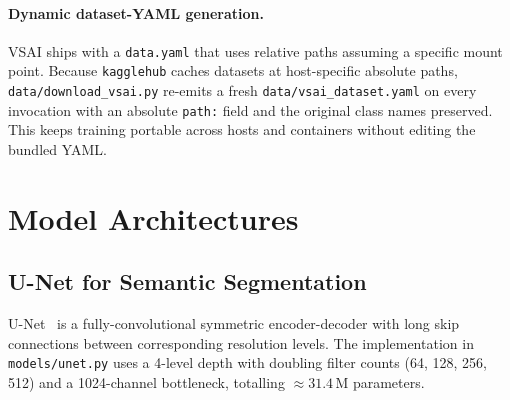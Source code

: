 \documentclass[11pt,a4paper]{article}
\begin{document}
\paragraph{Dynamic dataset-YAML generation.} VSAI ships with a \texttt{data.yaml}
that uses relative paths assuming a specific mount point. Because \texttt{kagglehub}
caches datasets at host-specific absolute paths, \texttt{data/download\_vsai.py}
re-emits a fresh \texttt{data/vsai\_dataset.yaml} on every invocation with an
absolute \texttt{path:} field and the original class names preserved. This keeps
training portable across hosts and containers without editing the bundled YAML.

\section{Model Architectures}

\subsection{U-Net for Semantic Segmentation}

U-Net~\cite{ronneberger2015unet} is a fully-convolutional symmetric encoder-decoder
with long skip connections between corresponding resolution levels. The implementation
in \texttt{models/unet.py} uses a 4-level depth with doubling filter counts
(64, 128, 256, 512) and a 1024-channel bottleneck, totalling $\approx 31.4$\,M parameters.
\end{document}
